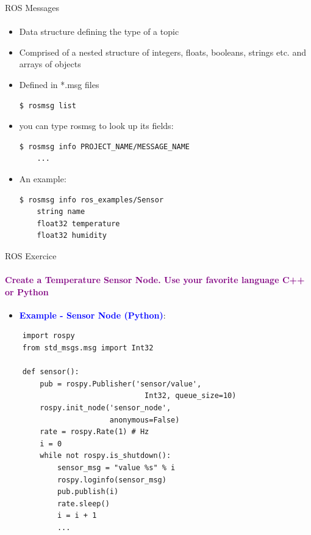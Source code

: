 \documentclass[aspectratio=169]{beamer}
\begin{document}
\begin{frame}[fragile]{ROS Messages}
	\framesubtitle{ }
	\begin{minipage}{0.6\textwidth}
    \begin{itemize}
        \item Data structure defining the type of a topic
		\item Comprised of a nested structure of integers, floats, booleans, strings etc. and arrays of objects
		\item Defined in *.msg files
		\begin{lstlisting}[language=bash]
	$ rosmsg list
		\end{lstlisting}
		\item you can type rosmsg to look up its fields:
		\begin{lstlisting}[language=bash]
	$ rosmsg info PROJECT_NAME/MESSAGE_NAME
	...
		\end{lstlisting}

		\item An example:
		\begin{lstlisting}[language=bash]
	$ rosmsg info ros_examples/Sensor 
	string name
	float32 temperature
	float32 humidity	
		\end{lstlisting}

    \end{itemize}

\end{minipage}
\begin{minipage}{0.4\textwidth}
	
\end{minipage}
\end{frame}

\begin{frame}[t,fragile]{ROS Exercice}
	\framesubtitle{\textcolor{purple}{Create a Temperature Sensor Node. Use your favorite language C++ or Python}}
	\begin{minipage}{0.6\textwidth}
		\begin{itemize}
			\item \textcolor{blue}{\textbf{Example - Sensor Node (Python)}}:
		\end{itemize}
	\begin{lstlisting}
	import rospy
	from std_msgs.msg import Int32

	def sensor():
		pub = rospy.Publisher('sensor/value', 
								Int32, queue_size=10)
		rospy.init_node('sensor_node',
						anonymous=False)
		rate = rospy.Rate(1) # Hz
		i = 0
		while not rospy.is_shutdown():
			sensor_msg = "value %s" % i
			rospy.loginfo(sensor_msg)
			pub.publish(i)
			rate.sleep()
			i = i + 1
			...
    \end{lstlisting}
\end{minipage}
\begin{minipage}{0.4\textwidth}
	
\end{minipage}
\end{frame}
\end{document}
